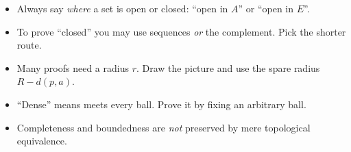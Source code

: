 \begin{tip}
\begin{itemize}
\item Always say \emph{where} a set is open or closed: ``open in $A$'' or ``open in $E$''.
\item To prove ``closed'' you may use sequences \emph{or} the complement. Pick the shorter route.
\item Many proofs need a radius $r$. Draw the picture and use the spare radius
  $R-d(p,a)$.
\item ``Dense'' means meets every ball. Prove it by fixing an arbitrary ball.
\item Completeness and boundedness are \emph{not} preserved by mere topological equivalence.
\end{itemize}
\end{tip}
